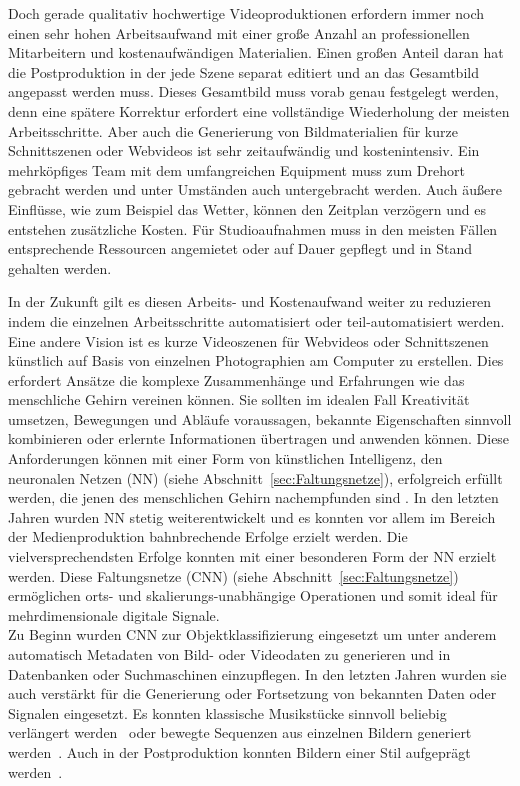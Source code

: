 \documentclass[times, 11pt,twocolumn]{article}
\begin{document}
Doch gerade qualitativ hochwertige Videoproduktionen erfordern immer noch einen sehr hohen Arbeitsaufwand mit einer große Anzahl an professionellen Mitarbeitern und kostenaufwändigen Materialien. Einen großen Anteil daran hat die Postproduktion in der jede Szene separat editiert und an das Gesamtbild angepasst werden muss. Dieses Gesamtbild muss vorab genau festgelegt werden, denn eine spätere Korrektur erfordert eine vollständige Wiederholung der meisten Arbeitsschritte. Aber auch die Generierung von Bildmaterialien für kurze Schnittszenen oder Webvideos ist sehr zeitaufwändig und kostenintensiv. Ein mehrköpfiges Team mit dem umfangreichen Equipment muss zum Drehort gebracht werden und unter Umständen auch untergebracht werden. Auch äußere Einflüsse, wie zum Beispiel das Wetter, können den Zeitplan verzögern und es entstehen zusätzliche Kosten. Für Studioaufnahmen muss in den meisten Fällen entsprechende Ressourcen angemietet oder auf Dauer gepflegt und in Stand gehalten werden.

In der Zukunft gilt es diesen Arbeits- und Kostenaufwand weiter zu reduzieren indem die einzelnen Arbeitsschritte automatisiert oder teil-automatisiert werden. Eine andere Vision ist es kurze Videoszenen für Webvideos oder Schnittszenen künstlich auf Basis von einzelnen Photographien am Computer zu erstellen. Dies erfordert Ansätze die komplexe Zusammenhänge und Erfahrungen wie das menschliche Gehirn vereinen können. Sie sollten im idealen Fall Kreativität umsetzen, Bewegungen und Abläufe voraussagen, bekannte Eigenschaften sinnvoll kombinieren oder erlernte Informationen übertragen und anwenden können. Diese Anforderungen können mit einer Form von künstlichen Intelligenz, den neuronalen Netzen (NN) (siehe Abschnitt~\ref{sec:Faltungsnetze}), erfolgreich erfüllt werden, die jenen des menschlichen Gehirn nachempfunden sind \cite{McCaigDG16}. In den letzten Jahren wurden NN stetig weiterentwickelt und es konnten vor allem im Bereich der Medienproduktion bahnbrechende Erfolge erzielt werden. Die vielversprechendsten Erfolge konnten mit einer besonderen Form der NN erzielt werden. Diese Faltungsnetze (CNN) (siehe Abschnitt~\ref{sec:Faltungsnetze}) ermöglichen orts- und skalierungs-unabhängige Operationen und somit ideal für mehrdimensionale digitale Signale.\\

Zu Beginn wurden CNN zur Objektklassifizierung eingesetzt um unter anderem automatisch Metadaten von Bild- oder Videodaten zu generieren und in Datenbanken oder Suchmaschinen einzupflegen. In den letzten Jahren wurden sie auch verstärkt für die Generierung oder Fortsetzung von bekannten Daten oder Signalen eingesetzt. Es konnten klassische Musikstücke sinnvoll beliebig verlängert werden~\cite{OordDZSVGKSK16} oder bewegte Sequenzen aus einzelnen Bildern generiert werden~\cite{Vondrick}. Auch in der Postproduktion konnten Bildern einer Stil aufgeprägt werden~\cite{DeepDream}. \\
\end{document}
